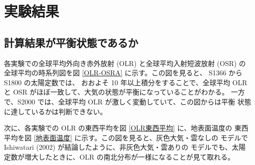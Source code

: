 \documentclass[body]{subfiles}
\begin{document}
\chapter{実験結果}

\section{計算結果が平衡状態であるか}

各実験での全球平均外向き赤外放射 (OLR) と全球平均入射短波放射 (OSR) の
全球平均の時系列図を図 \ref{OLR-OSRA} に示す。この図を見ると、 S1366
から S1800 の太陽定数では、 おおよそ 10 年以上積分をすることで、全球平均
OLR と OSR がほぼ一致して、大気の状態が平衡になっていることがわかる。
一方で、S2000 では、全球平均 OLR が激しく変動していて、この図からは平衡
状態に達しているかは判断できない。

次に、各実験での OLR の東西平均を図 \ref{OLR東西平均} に、地表面温度の
東西平均を図 \ref{地表面温度} に示す。この図を見ると、灰色大気・雲なしの
モデルで Ishiwatari \etal (2002) が結論したように、非灰色大気・雲ありの
モデルでも、太陽定数が増大したときに、OLR の南北分布が一様になることが見て取れる。
\end{document}
